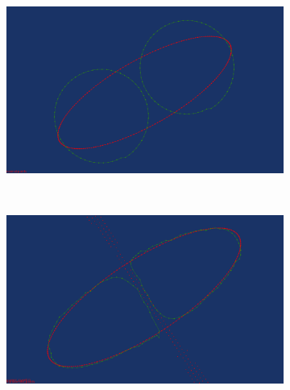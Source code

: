 \documentclass[3p,times]{elsarticle}
\begin{document}
\begin{figure}[ht]
\centering
\begin{subfigure}[b]{0.4\textwidth}
\includegraphics[width=\textwidth]{../picture/circle_ellipse_original_points.png}
\caption{}
\label{fig:circle_ellipse_meidal_original_points}
\end{subfigure}
~~~~~~~~~~~~~~~~~~~~~~~~~~~~~~~~~~~~
\begin{subfigure}[b]{0.4\textwidth}
\includegraphics[width=\textwidth]{../picture/circle_ellipse_medial_transformed.png}
\caption{}
\label{fig:circle_ellipse_medial_transformed}
\end{subfigure}


\end{figure}
\end{document}
